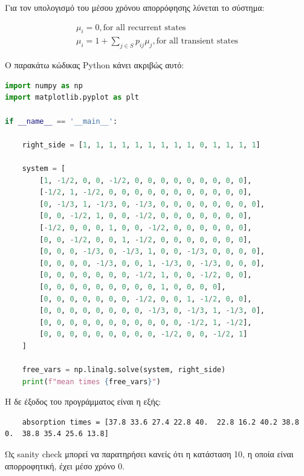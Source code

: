\documentclass{article}
\newcommand{\eng}[1]{\foreignlanguage{english}{#1}} %
\begin{document}
Για τον υπολογισμό του μέσου χρόνου απορρόφησης λύνεται το σύστημα:

\begin{equation}
    \begin{aligned}
        \mu_i = 0, \text{for all recurrent states}\\
        \mu_i = 1 + \sum_{j \in S} p_{ij} \mu_j, \text{for all transient states}
    \end{aligned}
\end{equation}

Ο παρακάτω κώδικας \eng{Python} κάνει ακριβώς αυτό:

\begin{lstlisting}[language=Python]
import numpy as np
import matplotlib.pyplot as plt

if __name__ == '__main__':

    right_side = [1, 1, 1, 1, 1, 1, 1, 1, 1, 0, 1, 1, 1, 1]

    system = [
        [1, -1/2, 0, 0, -1/2, 0, 0, 0, 0, 0, 0, 0, 0, 0],
        [-1/2, 1, -1/2, 0, 0, 0, 0, 0, 0, 0, 0, 0, 0, 0],
        [0, -1/3, 1, -1/3, 0, -1/3, 0, 0, 0, 0, 0, 0, 0, 0],
        [0, 0, -1/2, 1, 0, 0, -1/2, 0, 0, 0, 0, 0, 0, 0],
        [-1/2, 0, 0, 0, 1, 0, 0, -1/2, 0, 0, 0, 0, 0, 0],
        [0, 0, -1/2, 0, 0, 1, -1/2, 0, 0, 0, 0, 0, 0, 0],
        [0, 0, 0, -1/3, 0, -1/3, 1, 0, 0, -1/3, 0, 0, 0, 0],
        [0, 0, 0, 0, -1/3, 0, 0, 1, -1/3, 0, -1/3, 0, 0, 0],
        [0, 0, 0, 0, 0, 0, 0, -1/2, 1, 0, 0, -1/2, 0, 0],
        [0, 0, 0, 0, 0, 0, 0, 0, 0, 1, 0, 0, 0, 0],
        [0, 0, 0, 0, 0, 0, 0, -1/2, 0, 0, 1, -1/2, 0, 0],
        [0, 0, 0, 0, 0, 0, 0, 0, -1/3, 0, -1/3, 1, -1/3, 0],
        [0, 0, 0, 0, 0, 0, 0, 0, 0, 0, 0, -1/2, 1, -1/2],
        [0, 0, 0, 0, 0, 0, 0, 0, 0, -1/2, 0, 0, -1/2, 1]
    ]

    free_vars = np.linalg.solve(system, right_side)
    print(f"mean times {free_vars}")
\end{lstlisting}

Η δε έξοδος του προγράμματος είναι η εξής:

\begin{verbatim}
    absorption times = [37.8 33.6 27.4 22.8 40.  22.8 16.2 40.2 38.8  0.  38.8 35.4 25.6 13.8]
\end{verbatim}

Ως \eng{sanity check} μπορεί να παρατηρήσει κανείς ότι η κατάσταση 10, η οποία
είναι απορροφητική, έχει μέσο χρόνο 0.
\end{document}
